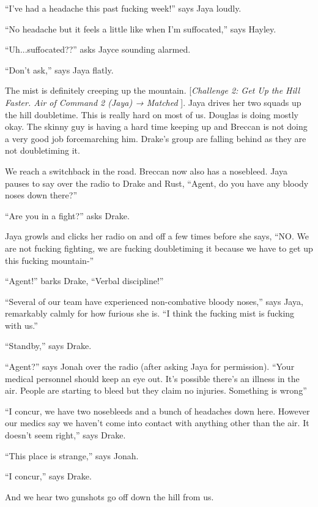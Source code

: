 ``I've had a headache this past fucking week!'' says Jaya loudly.

``No headache but it feels a little like when I'm suffocated,'' says Hayley.

``Uh...suffocated??'' asks Jayce sounding alarmed.

``Don't ask,'' says Jaya flatly.

The mist is definitely creeping up the mountain.  {[}\textit{Challenge 2: Get Up the Hill Faster.  Air of Command 2 (Jaya) → Matched }{]}. Jaya drives her two squads up the hill doubletime.  This is really hard on most of us.  Douglas is doing mostly okay.  The skinny guy is having a hard time keeping up and Breccan is not doing a very good job forcemarching him.  Drake's group are falling behind as they are not doubletiming it.



We reach a switchback in the road.  Breccan now also has a nosebleed.  Jaya pauses to say over the radio to Drake and Rust, ``Agent, do you have any bloody noses down there?''

``Are you in a fight?'' asks Drake.

Jaya growls and clicks her radio on and off a few times before she says, ``NO.  We are not fucking fighting, we are fucking doubletiming it because we have to get up this fucking mountain-''

``Agent!'' barks Drake, ``Verbal discipline!''

``Several of our team have experienced non-combative bloody noses,'' says Jaya, remarkably calmly for how furious she is.  ``I think the fucking mist is fucking with us.''

``Standby,'' says Drake.

``Agent?'' says Jonah over the radio (after asking Jaya for permission).  ``Your medical personnel should keep an eye out.  It's possible there's an illness in the air.  People are starting to bleed but they claim no injuries.  Something is wrong''

``I concur, we have two nosebleeds and a bunch of headaches down here.  However our medics say we haven't come into contact with anything other than the air.  It doesn't seem right,'' says Drake.

``This place is strange,'' says Jonah.

``I concur,'' says Drake. 

And we hear two gunshots go off down the hill from us.



